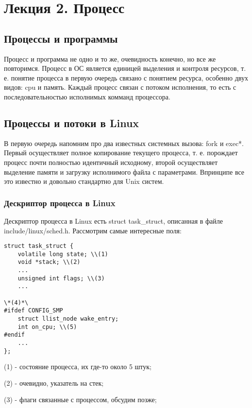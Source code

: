 \chapter{Лекция 2. Процесс}

\section{Процессы и программы}

Процесс и программа не одно и то же, очевидность конечно, но все же повторимся. Процесс в ОС является единицей выделения и контроля ресурсов, т. е. понятие процесса
в первую очередь связано с понятием ресурса, особенно двух видов: cpu и память. Каждый процесс связан с потоком исполнения, то есть с последовательностью исполнимых
комманд процессора.

\section{Процессы и потоки в Linux}

В первую очередь напомним про два известных системных вызова: fork и exec*. Первый осуществляет полное копирование текущего процесса, т. е. порождает процесс
почти полностью идентичный исходному, второй осуществляет выделение памяти и загрузку исполнимого файла с параметрами. Впринципе все это известно и довольно
стандартно для Unix систем.

\subsection{Дескриптор процесса в Linux}

Дескриптор процесса в Linux есть struct task\_struct, описанная в файле include/linux/sched.h. Рассмотрим самые интересные поля:
\begin{lstlisting}
struct task_struct {
	volatile long state; \\(1)
	void *stack; \\(2)
	...
	unsigned int flags; \\(3)
	...
	
\*(4)*\
#ifdef CONFIG_SMP
	struct llist_node wake_entry;
	int on_cpu; \\(5)
#endif
	...
};
\end{lstlisting}

(1) - состояние процесса, их где-то около 5 штук;

(2) - очевидно, указатель на стек;

(3) - флаги связанные с процессом, обсудим позже;

